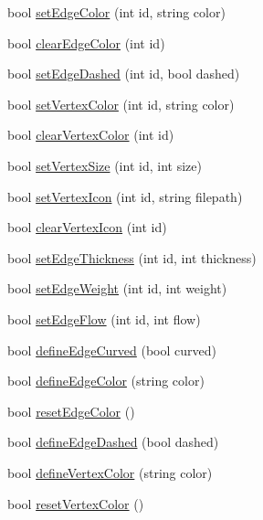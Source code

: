\begin{DoxyCompactItemize}
\item 
bool \hyperlink{class_graph_viewer_a07ccc96707efae4aa5f3ced3dca015af}{set\+Edge\+Color} (int id, string color)
\item 
bool \hyperlink{class_graph_viewer_a0e3bb8f6d7290e141c141ca83c9eb67a}{clear\+Edge\+Color} (int id)
\item 
bool \hyperlink{class_graph_viewer_a1698f1c6b3a8e7cabc7b7d7cf42fc7f0}{set\+Edge\+Dashed} (int id, bool dashed)
\item 
bool \hyperlink{class_graph_viewer_a8b542d7e09e81a45a74760c19233beb0}{set\+Vertex\+Color} (int id, string color)
\item 
bool \hyperlink{class_graph_viewer_a70e2f6cc24e545a66312a92cf5839d25}{clear\+Vertex\+Color} (int id)
\item 
bool \hyperlink{class_graph_viewer_ae930dfdfcdeb7a871eefb6028d74b9f9}{set\+Vertex\+Size} (int id, int size)
\item 
bool \hyperlink{class_graph_viewer_a02d5f7393eab9a2d1b66719039597a64}{set\+Vertex\+Icon} (int id, string filepath)
\item 
bool \hyperlink{class_graph_viewer_aecbeec01205b7f93cf73a65282f2daba}{clear\+Vertex\+Icon} (int id)
\item 
bool \hyperlink{class_graph_viewer_a07f598272fe3515455eab13be749604a}{set\+Edge\+Thickness} (int id, int thickness)
\item 
bool \hyperlink{class_graph_viewer_ac211de009a0afe2e6d44f4f8d030a2cc}{set\+Edge\+Weight} (int id, int weight)
\item 
bool \hyperlink{class_graph_viewer_a69eb065145063e4dea41961e92e35c8e}{set\+Edge\+Flow} (int id, int flow)
\item 
bool \hyperlink{class_graph_viewer_a08f362be0e682d91e7506dca8caae1b8}{define\+Edge\+Curved} (bool curved)
\item 
bool \hyperlink{class_graph_viewer_a4102580b69826ba83251ef7bb262f8be}{define\+Edge\+Color} (string color)
\item 
bool \hyperlink{class_graph_viewer_a1df1a30f4668bf70364fac232f8d0600}{reset\+Edge\+Color} ()
\item 
bool \hyperlink{class_graph_viewer_af785279b5c204df0e274b20c36276fc3}{define\+Edge\+Dashed} (bool dashed)
\item 
bool \hyperlink{class_graph_viewer_a76de8676b7a93d72af514b84cdaa4d21}{define\+Vertex\+Color} (string color)
\item 
bool \hyperlink{class_graph_viewer_acd95eee309d5e9b1935ec39c5ed45cac}{reset\+Vertex\+Color} ()

\end{DoxyCompactItemize}
